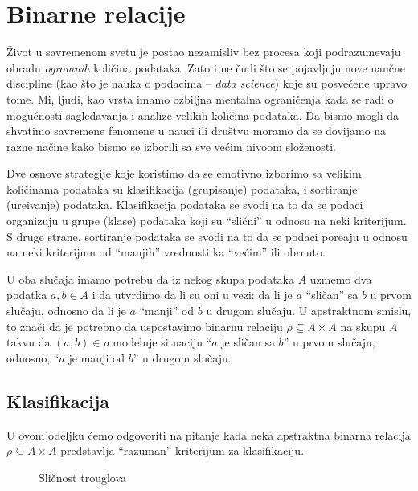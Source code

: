 \chapter{Binarne relacije}

\v Zivot u savremenom svetu je postao nezamisliv bez procesa koji podrazumevaju obradu \emph{ogromnih} koli\v cina podataka.
Zato i ne \v cudi \v sto se pojavljuju nove nau\v cne discipline (kao \v sto je nauka o podacima -- \emph{data science})
koje su posve\'cene upravo tome.
Mi, ljudi, kao vrsta imamo ozbiljna mentalna ograni\v cenja kada se radi o mogu\'cnosti
sagledavanja i analize velikih koli\v cina podataka. Da bismo mogli da shvatimo savremene fenomene u nauci ili dru\v stvu
moramo da se dovijamo na razne na\v cine kako bismo se izborili sa sve ve\'cim nivoom slo\v zenosti.

Dve osnove strategije koje koristimo da se emotivno izborimo sa velikim koli\v cinama podataka su
klasifikacija (grupisanje) podataka, i sortiranje (ure\dj ivanje) podataka.
Klasifikacija podataka se svodi na to da se podaci organizuju u grupe (klase) podataka
koji su \enquote{sli\v cni} u odnosu na neki kriterijum. S druge strane, sortiranje podataka se svodi na to da se
podaci pore\dj aju u odnosu na neki kriterijum od \enquote{manjih} vrednosti ka \enquote{ve\'cim} ili obrnuto.

U oba slu\v caja imamo potrebu da iz nekog skupa podataka $A$ uzmemo dva podatka
$a, b \in A$ i da utvrdimo da li su oni u vezi: da li je $a$ \enquote{sli\v can} sa $b$ u prvom slu\v caju, odnosno
da li je $a$ \enquote{manji} od $b$ u drugom slu\v caju.
U apstraktnom smislu, to zna\v ci da je potrebno da uspostavimo binarnu relaciju
$\rho \subseteq A \times A$ na skupu $A$ takvu da
$(a, b) \in \rho$ modeluje situaciju \enquote{$a$ je sli\v can sa $b$} u prvom slu\v caju,
odnosno, \enquote{$a$ je manji od $b$} u drugom slu\v caju.

\section{Klasifikacija}

U ovom odeljku \'cemo odgovoriti na pitanje
kada neka apstraktna binarna relacija $\rho \subseteq A \times A$ predstavlja
\enquote{razuman} kriterijum za klasifikaciju.

\begin{figure}
    \centering
    
    \caption{Sli\v cnost trouglova}    
    \label{ft07.fig.slicnost}
\end{figure}

